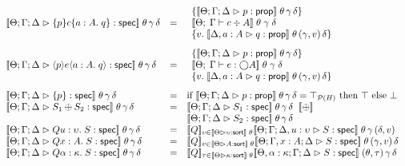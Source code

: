 \begin{figure}
\begin{displaymath}
\begin{array}{lcl}
\interp{\judgeS{\spec{p}{c}{a:A}{q}}}\;\theta\,\gamma\,\delta & = & 
   \begin{array}{l}
     \setof{\interp{\judgeA{p}{\assert}}\;\theta\,\gamma\,\delta} \\
      \interp{\judgeC{\Gamma}{c}{A}}\;\theta\;\gamma\;\delta \\
     \setof{v.\; \interp{\judgeA[\Delta, a:A]{q}{\assert}}\;\theta\,(\gamma,v)\,\delta} \\
   \end{array} 
\\[2em]

\interp{\judgeS{\mspec{p}{e}{a:A}{q}}}\;\theta\,\gamma\,\delta & = & 
   \begin{array}{l}
     \setof{\interp{\judgeA{p}{\assert}}\;\theta\,\gamma\,\delta} \\
      \interp{\judgeE{\Gamma}{e}{\monad{A}}}\;\theta\;\gamma\;\delta \\
     \setof{v.\; \interp{\judgeA[\Delta, a:A]{q}{\assert}}\;\theta\,(\gamma,v)\,\delta} \\
   \end{array} 
\\[2em]

\interp{\judgeS{\setof{p}}}\;\theta\,\gamma\,\delta & = & 
  \mbox{if } \interp{\judgeA{p}{\assert}}\;\theta\,\gamma\,\delta = \top_{\powerset{H}}
  \mbox{ then } \top 
  \mbox{ else } \bot \\

\interp{\judgeS{S_1 \oplus S_2}}\;\theta\,\gamma\,\delta & = & 
  \interp{\judgeS{S_1}}\;\theta\,\gamma\,\delta \;\;\interp{\oplus} \\ 
&& \interp{\judgeS{S_2}}\;\theta\,\gamma\,\delta \\

\interp{\judgeS{Q u:\upsilon.\; S}}\;\theta\,\gamma\,\delta & = & 
  \interp{Q}_{v \in \interp{\judgeSort{\upsilon}}\;\theta} 
     \interp{\judgeS[\Theta;\Gamma;\Delta, u:\upsilon]{S}}\;\theta\,\gamma\,(\delta,v) \\

\interp{\judgeS{Q x:A.\; S}}\;\theta\,\gamma\,\delta & = & 
  \interp{Q}_{v \in \interp{\judgeSort{A}}\;\theta} 
     \interp{\judgeS[\Theta;\Gamma,x:A;\Delta]{S}}\;\theta\,(\gamma,v)\,\delta \\

\interp{\judgeS{Q \alpha:\kappa.\; S}}\;\theta\,\gamma\,\delta & = & 
  \interp{Q}_{\tau \in \interp{\judgeSort{\kappa}}\;\theta} 
     \interp{\judgeS[\Theta,\alpha:\kappa;\Gamma;\Delta]{S}}\;(\theta,\tau)\,\gamma\,\delta \\[1em]



\end{array}
\end{displaymath}
\end{figure}
